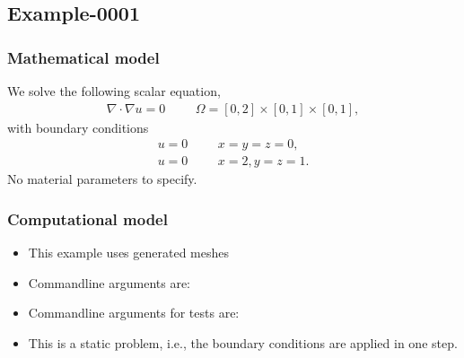 %
\clearpage
%
\subsection{Example-0001}
%
%
\subsubsection{Mathematical model}
%
We solve the following scalar equation,
%
\begin{align}
    \nabla \cdot \nabla u = 0 & &&\Omega = [0, 2] \times [0, 1] \times [0, 1],
\end{align}
%
with boundary conditions
%
\begin{align}
    u = 0 & &&x = y = z = 0, \\
    u = 0 & &&x = 2, y = z = 1.
\end{align}
%
No material parameters to specify.
%
%
\subsubsection{Computational model}
%
\begin{itemize}
    \item{This example uses generated meshes}
    \item{Commandline arguments are:}
    \item{Commandline arguments for tests are:}
    \item{This is a static problem, i.e., the boundary conditions are applied in one step.}
\end{itemize}
%
%
